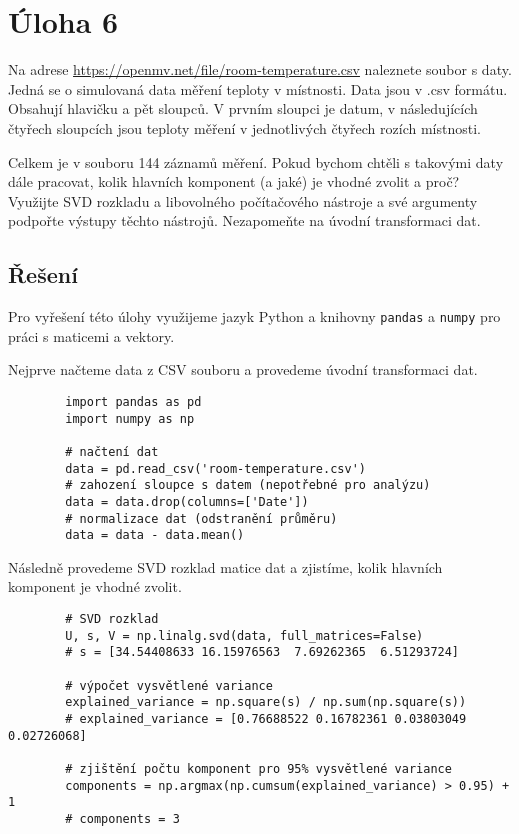 \documentclass[10pt, a4paper]{ReportSheet}
\newcommand{\uloha}[5]{
    \section{Úloha #1\hfill\small\normalfont{(#2 body)}}
    \label{sec:uloha-#1}
    #3
    \subsection{Řešení}
    \label{subsec:uloha-#1-reseni}
    #4
    \ifthenelse{\equal{#5}{false}}{}{\newpage}
}
\begin{document}
    \uloha{6}{3}{
        Na adrese \url{https://openmv.net/file/room-temperature.csv} naleznete soubor s daty. Jedná se o simulovaná data měření teploty v místnosti. Data jsou v .csv formátu. Obsahují hlavičku a pět sloupců. V prvním sloupci je datum, v následujících čtyřech sloupcích jsou teploty měření v jednotlivých čtyřech rozích místnosti.

        Celkem je v souboru 144 záznamů měření. Pokud bychom chtěli s takovými daty dále pracovat, kolik hlavních komponent (a jaké) je vhodné zvolit a proč?
        Využijte SVD rozkladu a libovolného počítačového nástroje a své argumenty podpořte výstupy těchto nástrojů. Nezapomeňte na úvodní transformaci dat.
    }{
        Pro vyřešení této úlohy využijeme jazyk Python a knihovny \texttt{pandas} a \texttt{numpy} pro práci s
        maticemi a vektory.
    }{false}
    Nejprve načteme data z CSV souboru a provedeme úvodní transformaci dat.
    \begin{verbatim}
        import pandas as pd
        import numpy as np

        # načtení dat
        data = pd.read_csv('room-temperature.csv')
        # zahození sloupce s datem (nepotřebné pro analýzu)
        data = data.drop(columns=['Date'])
        # normalizace dat (odstranění průměru)
        data = data - data.mean()
    \end{verbatim}

    Následně provedeme SVD rozklad matice dat a zjistíme, kolik hlavních komponent je vhodné zvolit.
    \begin{verbatim}
        # SVD rozklad
        U, s, V = np.linalg.svd(data, full_matrices=False)
        # s = [34.54408633 16.15976563  7.69262365  6.51293724]

        # výpočet vysvětlené variance
        explained_variance = np.square(s) / np.sum(np.square(s))
        # explained_variance = [0.76688522 0.16782361 0.03803049 0.02726068]

        # zjištění počtu komponent pro 95% vysvětlené variance
        components = np.argmax(np.cumsum(explained_variance) > 0.95) + 1
        # components = 3
    \end{verbatim}

    \newpage
\end{document}
